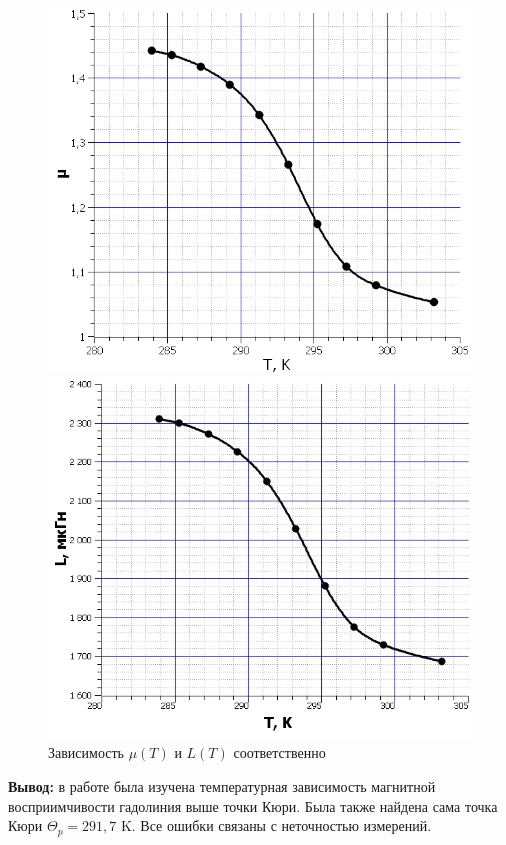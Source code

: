 \documentclass[a4paper,12pt]{article} %
\begin{document}
\begin{figure}[h]
\begin{minipage}[h]{0.49\linewidth}
	\centering
	\includegraphics[scale=0.57]{Pictures/mu(T).jpg}
\end{minipage}
\hfill
\begin{minipage}[h]{0.49\linewidth}
	\includegraphics[scale=0.65]{Pictures/L(T).jpg}
\end{minipage}

\caption{Зависимость $\mu (T)$ и $L(T)$ соответственно}
\end{figure}

\newpage

\textbf{Вывод:} в работе была изучена температурная зависимость магнитной восприимчивости гадолиния выше точки Кюри. Была также найдена сама точка Кюри $\Theta_p = 291,7$ K. Все ошибки связаны с неточностью измерений.
\end{document}
